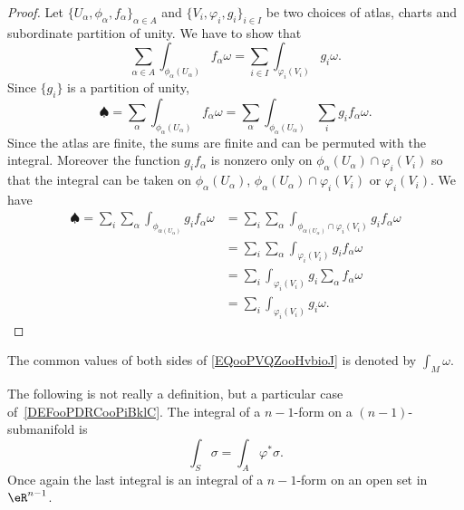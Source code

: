 \begin{proof}
	Let \(  \{ U_{\alpha},\phi_{\alpha},f_{\alpha} \}_{\alpha\in A}  \) and \( \{ V_i,\varphi_i,g_i \}_{i\in I}\) be two choices of atlas, charts and subordinate partition of unity. We have to show that
	\begin{equation}        \label{EQooPVQZooHvbioJ}
		\sum_{\alpha\in A}\int_{\phi_{\alpha}(U_{\alpha})}f_{\alpha}\omega=\sum_{i\in I}\int_{\varphi_i(V_i)}g_i\omega.
	\end{equation}
	Since \( \{ g_i \}\) is a partition of unity,
	\begin{equation}
		\spadesuit=\sum_{\alpha}\int_{\phi_{\alpha}(U_{\alpha})}f_{\alpha}\omega=\sum_{\alpha}\int_{\phi_{\alpha}(U_{\alpha})}\sum_ig_if_{\alpha}\omega.
	\end{equation}
	Since the atlas are finite, the sums are finite and can be permuted with the integral. Moreover the function \( g_if_{\alpha}\) is nonzero only on \( \phi_{\alpha}(U_{\alpha})\cap\varphi_i(V_i)\) so that the integral can be taken on \( \phi_{\alpha}(U_{\alpha})\), \( \phi_{\alpha}(U_{\alpha})\cap\varphi_i(V_i)\) or \( \varphi_i(V_i)\). We have
	\begin{subequations}
		\begin{align}
			\spadesuit=\sum_i\sum_{\alpha}\int_{\phi_{\alpha(U_{\alpha})}}g_if_{\alpha}\omega & =  \sum_i\sum_{\alpha}\int_{\phi_{\alpha(U_{\alpha})}\cap \varphi_i(V_i)}g_if_{\alpha}\omega \\
			                                                                                  & =  \sum_i\sum_{\alpha}\int_{\varphi_i(V_i)}g_if_{\alpha}\omega                               \\
			                                                                                  & = \sum_i\int_{\varphi_i(V_i)}g_i\sum_{\alpha}f_{\alpha}\omega                                \\
			                                                                                  & =\sum_i\int_{\varphi_i(V_i)}g_i\omega.
		\end{align}
	\end{subequations}
\end{proof}
The common values of both sides of \eqref{EQooPVQZooHvbioJ} is denoted by \( \int_M\omega\).

The following is not really a definition, but a particular case of~\ref{DEFooPDRCooPiBklC}. The integral of a \( n-1\)-form on a \( (n-1)\)-submanifold is
\begin{equation}        \label{EQooYPOGooRYOXQe}
	\int_S\sigma=\int_A\varphi^*\sigma.
\end{equation}
Once again the last integral is an integral of a \( n-1\)-form on an open set in \( \eR^{n-1}\).

